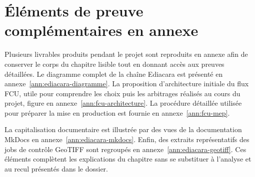
\section{Éléments de preuve complémentaires en annexe}

Plusieurs livrables produits pendant le projet sont reproduits en annexe afin de conserver le corps du chapitre lisible tout en donnant accès aux preuves détaillées. Le diagramme complet de la chaîne Ediacara est présenté en annexe~\ref{ann:ediacara-diagramme}. La proposition d'architecture initiale du flux FCU, utile pour comprendre les choix puis les arbitrages réalisés au cours du projet, figure en annexe~\ref{ann:fcu-architecture}. La procédure détaillée utilisée pour préparer la mise en production est fournie en annexe~\ref{ann:fcu-mep}.

La capitalisation documentaire est illustrée par des vues de la documentation MkDocs en annexe~\ref{ann:ediacara-mkdocs}. Enfin, des extraits représentatifs des jobs de contrôle GeoTIFF sont regroupés en annexe~\ref{ann:ediacara-geotiff}. Ces éléments complètent les explications du chapitre sans se substituer à l'analyse et au recul présentés dans le dossier.
